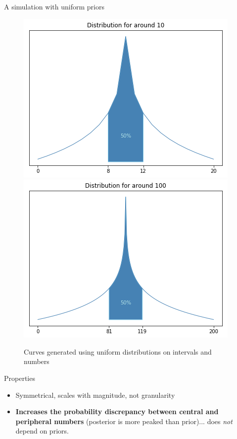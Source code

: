 \documentclass[xcolor=table, hyperref={pdfpagelabels=false}]{beamer}
\begin{document}
\begin{frame}{A simulation with uniform priors}\vspace{-3mm}
\begin{figure}
\includegraphics[width=.4\textwidth]{./images/around_10_prob_simple.png}
\includegraphics[width=.4\textwidth]{./images/around_100_prob_simple.png}
\caption{Curves generated using uniform distributions on intervals and numbers}
\end{figure}
\vspace{-8mm}
\begin{block}{Properties}
\begin{itemize}
	\item Symmetrical, scales with magnitude, not granularity \pause
	\item \textbf{Increases the probability discrepancy between central and peripheral numbers} (posterior is more peaked than prior)... does \textit{not} depend on priors. 
\end{itemize}
\end{block}
\end{frame}
\end{document}
